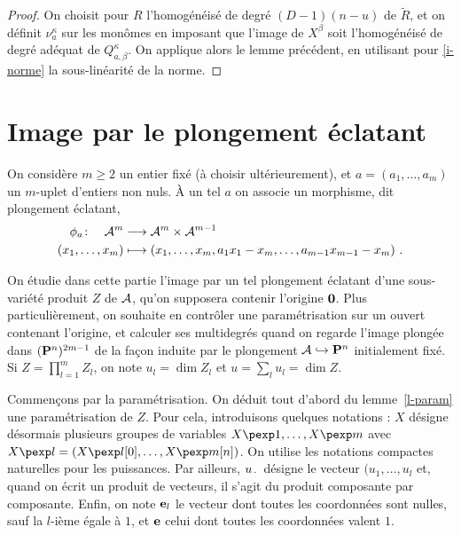\documentclass{mpg-preth}
\begin{document}
\begin{proof}
  On choisit pour $R$ l'homogénéisé de degré $(D-1)(n-u)$ de $\widetilde R$, et
  on définit $\nu_a^\kappa$ sur les monômes en imposant que l'image de $X^\beta$
  soit l'homogénéisé de degré adéquat de $Q_{a, \beta}^\kappa$. On applique
  alors le lemme précédent, en utilisant pour \ref{i-norme} la sous-linéarité de
  la norme.
\end{proof}


\section{Image par le plongement éclatant}

On considère $m \ge 2$ un entier fixé (à choisir ultérieurement), et $a = (a_1,
\ldots, a_m)$ un $m$-uplet d'entiers non nuls. À un tel $a$ on associe un
morphisme, dit plongement éclatant,
\begin{align*}
  \phi_a \colon\quad \mathcal A^m &\longrightarrow \mathcal A^m\times \mathcal A^{m-1} \\
  (x_1, \ldots, x_m)&\longmapsto (x_1, \ldots, x_m, a_1 x_1 - x_m, \ldots,
  a_{m-1} x_{m-1} - x_m) \text{ .}
\end{align*}

On étudie dans cette partie l'image par un tel plongement éclatant d'une
sous-variété produit $Z$ de $\mathcal A$, qu'on supposera contenir l'origine ${\boldsymbol{0}}$. Plus
particulièrement, on souhaite en contrôler une paramétrisation sur un ouvert
contenant l'origine, et calculer ses multidegrés quand on regarde l'image
plongée dans $({\mathbf{P}}^n)^{2m-1}$ de la façon induite par le plongement $\mathcal A
\hookrightarrow {\mathbf{P}}^n$ initialement fixé. Si $Z = \prod_{l=1}^m Z_l$, on note
$u_l = \dim Z_l$ et $u=\sum_l u_l = \dim Z$.

\medskip
Commençons par la paramétrisation. On déduit tout d'abord du lemme~\ref{l-param}
une paramétrisation de $Z$. Pour cela, introduisons quelques notations : $X$
désigne désormais plusieurs groupes de variables $X\pexp1, \ldots, X\pexp m$
avec $X\pexp l = (X\pexp l[0], \ldots, X\pexp m[n])$. On utilise les notations
compactes naturelles pour les puissances. Par ailleurs, $u_{\,\cdot\,}$ désigne le
vecteur $(u_1, \ldots, u_l$ et, quand on écrit un produit de vecteurs, il s'agit
du produit composante par composante. Enfin, on note ${\mathbf e}_l$ le vecteur dont
toutes les coordonnées sont nulles, sauf la $l$-ième égale à $1$, et ${\mathbf e}$ celui
dont toutes les coordonnées valent $1$.
\end{document}
